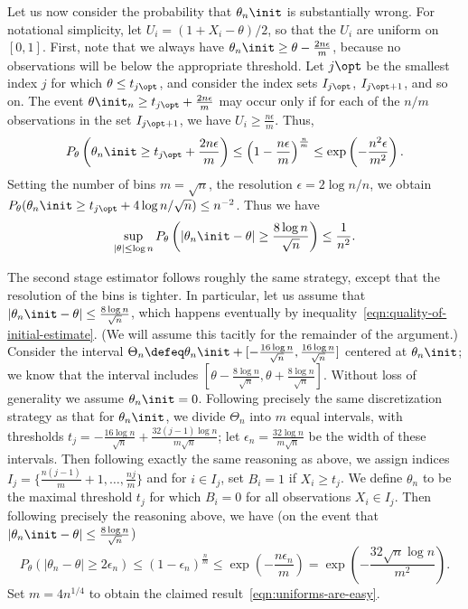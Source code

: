 Let us now consider the probability that $\theta_n\init$ is substantially
wrong. For notational simplicity, let $U_i = (1 + X_i - \theta) / 2$, so that
the $U_i$ are uniform on $[0, 1]$.
First, note that we always have $\theta_n\init \ge \theta
- \frac{2 n \epsilon}{m}$, because no observations will be below
the appropriate threshold. Let $j\opt$ be the smallest index $j$
for which $\theta \le t_{j\opt}$, and consider
the index sets $I_{j\opt}$, $I_{j\opt + 1}$, and so on.
The event $\theta\init_n \ge t_{j\opt} + \frac{2 n \epsilon}{m}$ may
occur only if for each of the $n/m$ observations in the set
$I_{j\opt + 1}$, we have $U_i \ge \frac{n \epsilon}{m}$. Thus,
\begin{equation*}
  P_\theta\left(\theta_n\init \ge t_{j\opt} + \frac{2 n \epsilon}{m}
  \right)
  \le \left(1 - \frac{n \epsilon}{m}\right)^\frac{n}{m}
  \le \exp\left(-\frac{n^2\epsilon}{m^2}\right).
\end{equation*}
Setting the number of bins $m = \sqrt{n}$,
the resolution $\epsilon = 2 \log n / n$, we obtain
$P_\theta(\theta_n\init \ge t_{j\opt} + 4 \log n / \sqrt{n})
\le n^{-2}$. Thus we have
\begin{equation}
  \label{eqn:quality-of-initial-estimate}
  \sup_{|\theta| \le \log n} P_\theta\left(|\theta_n\init - \theta| \ge
  \frac{8 \log n}{\sqrt{n}}\right) \le \frac{1}{n^2}.
\end{equation}

The second stage estimator follows roughly the same strategy, except that
the resolution of the bins is tighter. In particular, let us assume that
$|\theta_n\init - \theta| \le \frac{8 \log n}{\sqrt{n}}$, which happens
eventually by inequality~\eqref{eqn:quality-of-initial-estimate}.  (We will
assume this tacitly for the remainder of the argument.)  Consider the
interval $\Theta_n \defeq \theta_n\init + [-\frac{16 \log n}{\sqrt{n}},
  \frac{16 \log n}{\sqrt{n}}]$ centered at $\theta_n\init$; we know that the
interval includes $[\theta - \frac{8 \log n}{\sqrt{n}}, \theta + \frac{8
    \log n}{\sqrt{n}}]$. Without loss of generality we assume $\theta_n\init
= 0$.  Following precisely the same discretization strategy as that for
$\theta_n\init$, we divide $\Theta_n$ into $m$ equal intervals, with
thresholds $t_j = -\frac{16 \log n}{\sqrt{n}} + \frac{32 (j - 1) \log n}{m
  \sqrt{n}}$; let $\epsilon_n = \frac{32 \log n}{m \sqrt{n}}$ be the width of
these intervals.  Then following exactly the same reasoning as above, we
assign indices $I_j = \{\frac{n(j - 1)}{m} + 1, \ldots, \frac{n j}{m}\}$ and
for $i \in I_j$, set $B_i = 1$ if $X_i \ge t_j$. We define $\theta_n$ to be
the maximal threshold $t_j$ for which $B_i = 0$ for all observations $X_i
\in I_j$. Then following precisely the reasoning above, we have (on the
event that $|\theta_n\init - \theta| \le \frac{8 \log n}{\sqrt{n}}$)
\begin{equation*}
  P_\theta(|\theta_n - \theta|
  \ge 2 \epsilon_n)
  \le (1 - \epsilon_n)^\frac{n}{m}
  \le \exp\left(-\frac{n \epsilon_n}{m}\right)
  = \exp\left(-\frac{32 \sqrt{n} \log n}{m^2}\right).
\end{equation*}
Set $m = 4 n^{1/4}$ to obtain the claimed
result~\eqref{eqn:uniforms-are-easy}.



